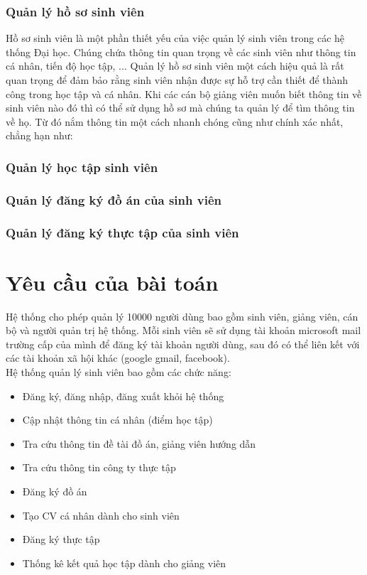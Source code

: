 \subsubsection*{Quản lý hồ sơ sinh viên}
Hồ sơ sinh viên là một phần thiết yếu của việc quản lý sinh viên trong các hệ thống Đại học. 
Chúng chứa thông tin quan trọng về các sinh viên như thông tin cá nhân, tiến độ học tập, ... 
Quản lý hồ sơ sinh viên một cách hiệu quả là rất quan trọng để đảm bảo rằng sinh viên nhận được sự hỗ trợ cần thiết để thành công trong học tập và cá nhân.
Khi các cán bộ giảng viên muốn biết thông tin về sinh viên nào đó thì có thể sử dụng hồ sơ mà chúng ta quản lý để tìm thông tin về họ.
Từ đó nắm thông tin một cách nhanh chóng cũng như chính xác nhất, chẳng hạn như: 
\subsubsection*{Quản lý học tập sinh viên}
\subsubsection*{Quản lý đăng ký đồ án của sinh viên}
\subsubsection*{Quản lý đăng ký thực tập của sinh viên}

\section{Yêu cầu của bài toán}
Hệ thống cho phép quản lý 10000 người dùng bao gồm sinh viên, giảng viên, cán bộ và người quản trị hệ thống.
Mỗi sinh viên sẽ sử dụng tài khoản microsoft mail trường cấp của mình để đăng ký tài khoản người dùng, sau đó có thể liên kết với
các tài khoản xã hội khác (google gmail, facebook). \\

Hệ thống quản lý sinh viên bao gồm các chức năng:
\begin{itemize}
	\item Đăng ký, đăng nhập, đăng xuất khỏi hệ thống
	\item Cập nhật thông tin cá nhân (điểm học tập)
	\item Tra cứu thông tin đề tài đồ án, giảng viên hướng dẫn
	\item Tra cứu thông tin công ty thực tập
	\item Đăng ký đồ án
	\item Tạo CV cá nhân dành cho sinh viên
	\item Đăng ký thực tập
	\item Thống kê kết quả học tập dành cho giảng viên
\end{itemize}


